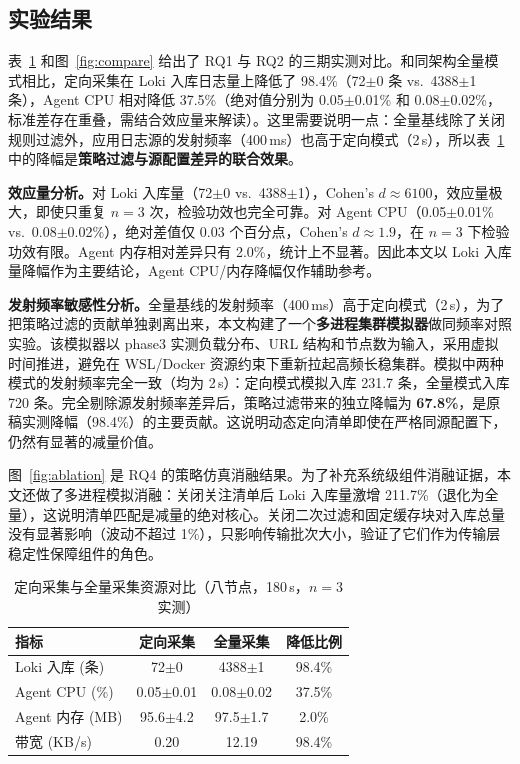 \subsection{实验结果}
表~\ref{tab:compare} 和图~\ref{fig:compare} 给出了 RQ1 与 RQ2 的三期实测对比。和同架构全量模式相比，定向采集在 Loki 入库日志量上降低了 98.4\%（72$\pm$0 条 vs.\ 4388$\pm$1 条），Agent CPU 相对降低 37.5\%（绝对值分别为 0.05$\pm$0.01\% 和 0.08$\pm$0.02\%，标准差存在重叠，需结合效应量来解读）。这里需要说明一点：全量基线除了关闭规则过滤外，应用日志源的发射频率（400\,ms）也高于定向模式（2\,s），所以表~\ref{tab:compare} 中的降幅是\textbf{策略过滤与源配置差异的联合效果}。

\textbf{效应量分析。}对 Loki 入库量（72$\pm$0 vs.\ 4388$\pm$1），Cohen's $d{\approx}6100$，效应量极大，即使只重复 $n{=}3$ 次，检验功效也完全可靠。对 Agent CPU（0.05$\pm$0.01\% vs.\ 0.08$\pm$0.02\%），绝对差值仅 0.03 个百分点，Cohen's $d{\approx}1.9$，在 $n{=}3$ 下检验功效有限。Agent 内存相对差异只有 2.0\%，统计上不显著。因此本文以 Loki 入库量降幅作为主要结论，Agent CPU/内存降幅仅作辅助参考。

\textbf{发射频率敏感性分析。}全量基线的发射频率（400\,ms）高于定向模式（2\,s），为了把策略过滤的贡献单独剥离出来，本文构建了一个\textbf{多进程集群模拟器}做同频率对照实验。该模拟器以 phase3 实测负载分布、URL 结构和节点数为输入，采用虚拟时间推进，避免在 WSL/Docker 资源约束下重新拉起高频长稳集群。模拟中两种模式的发射频率完全一致（均为 2\,s）：定向模式模拟入库 231.7 条，全量模式入库 720 条。完全剔除源发射频率差异后，策略过滤带来的独立降幅为 \textbf{67.8\%}，是原稿实测降幅（98.4\%）的主要贡献。这说明动态定向清单即使在严格同源配置下，仍然有显著的减量价值。

图~\ref{fig:ablation} 是 RQ4 的策略仿真消融结果。为了补充系统级组件消融证据，本文还做了多进程模拟消融：关闭关注清单后 Loki 入库量激增 211.7\%（退化为全量），这说明清单匹配是减量的绝对核心。关闭二次过滤和固定缓存块对入库总量没有显著影响（波动不超过 1\%），只影响传输批次大小，验证了它们作为传输层稳定性保障组件的角色。

\begin{table}[htbp]
  \centering
  \caption{定向采集与全量采集资源对比（八节点，180\,s，$n{=}3$ 实测）}\label{tab:compare}
  \begin{tabular}{lccc}
    \toprule
    指标 & 定向采集 & 全量采集 & 降低比例 \\
    \midrule
    Loki 入库 (条) & 72$\pm$0 & 4388$\pm$1 & 98.4\% \\
    Agent CPU (\%) & 0.05$\pm$0.01 & 0.08$\pm$0.02 & 37.5\% \\
    Agent 内存 (MB) & 95.6$\pm$4.2 & 97.5$\pm$1.7 & 2.0\% \\
    带宽 (KB/s) & 0.20 & 12.19 & 98.4\% \\
    \bottomrule
  \end{tabular}
\end{table}

